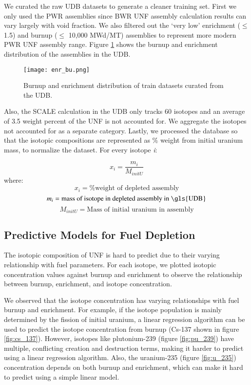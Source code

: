 We curated the raw \gls{UDB} datasets to generate
a cleaner training set. First we only used the 
\gls{PWR} assemblies since \gls{BWR} \gls{UNF} assembly
calculation results can vary largely with void fraction.
We also filtered out the
`very low' enrichment ($\leq$ 1.5) and
burnup ($\leq$ 10,000 MWd/MT)
assemblies to represent more modern \gls{PWR} \gls{UNF}
assembly range. Figure \ref{fig:enr_bu} shows the
burnup and enrichment distribution of the assemblies in the
\gls{UDB}.


\begin{figure}
    \centering
    \texttt{[image: enr\_bu.png]}
    \caption{Burnup and enrichment distribution of train
             datasets curated from the \gls{UDB}.}
    \label{fig:enr_bu}
\end{figure}


Also, the SCALE calculation in the \gls{UDB} only tracks 60 isotopes
and an average of 3.5 weight percent of the \gls{UNF} is not accounted for. We
aggregate the isotopes not accounted for as a separate category. Lastly,
we processed the database so that the isotopic compositions are 
represented as \% weight from initial uranium mass, to normalize
the dataset. For every isotope \textit{i}:

\begin{equation}
x_i = \frac{m_i}{M_{initU}}
\end{equation}
where:
\[
x_i = \text{\% weight of depleted assembly}
\]
\[
m_i = \text{mass of isotope in depleted assembly in \gls{UDB}}
\]
\[
M_{initU} = \text{Mass of initial uranium in assembly}
\]


\subsection{Predictive Models for Fuel Depletion}

The isotopic composition of \gls{UNF} is hard to predict due to their
varying relationship with fuel parameters. For each
isotope, we plotted isotopic concentration values against
burnup and enrichment to observe the relationship between
burnup, enrichment, and isotope concentration.

We observed that the isotope concentration has varying
relationships with fuel burnup and enrichment.
For example, if the isotope population is mainly determined by
the fission of initial uranium, a linear regression algorithm
can be used to predict the isotope concentration from burnup
(Cs-137 shown in figure \ref{fig:cs_137}).
However, isotopes like plutonium-239 (figure \ref{fig:pu_239}) have multiple, conflicting creation
and destruction terms, making it harder to predict using a
linear regression algorithm. Also, the uranium-235 (figure \ref{fig:u_235}) concentration
depends on both burnup and enrichment, which can make it
hard to predict using a simple linear model.

